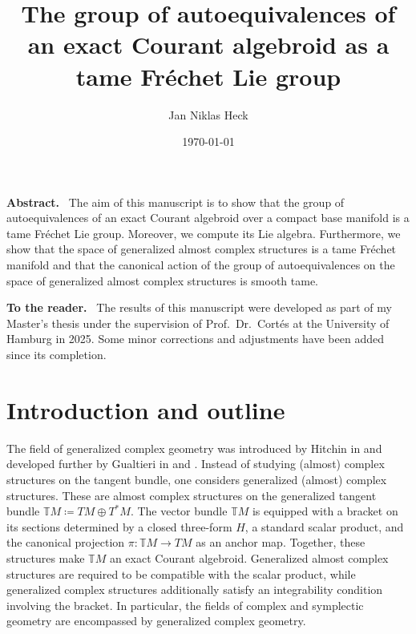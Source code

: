\documentclass[12pt,a4paper]{article}
\title{The group of autoequivalences of an exact Courant algebroid as a tame Fréchet Lie group}
\author{Jan Niklas Heck}
\date{\today}
\theoremstyle{plain}
\theoremstyle{definition}
\newenvironment{tothereader}
{\par\bigskip
\begin{center}
\bfseries To the reader
\end{center}
\begin{quote}}
{\end{quote}\par\bigskip}
\renewenvironment{tothereader}
  {\small\noindent\textbf{To the reader.}\ }
  {}
\newcommand{\GenTM}{\mathbb TM}
\renewenvironment{abstract}
  {\small\noindent\textbf{Abstract.}\ }
  {}
\begin{document}


\maketitle

\begin{abstract}
The aim of this manuscript is to show that the group of autoequivalences of an exact Courant algebroid over a compact base manifold is a tame Fréchet Lie group.
Moreover, we compute its Lie algebra.
Furthermore, we show that the space of generalized almost complex structures is a tame Fréchet manifold and that the canonical action of the group of autoequivalences on the space of generalized almost complex structures is smooth tame.
\end{abstract}
\newline

\begin{tothereader}
The results of this manuscript were developed as part of my Master's thesis \cite{MyMastThesis} under the supervision of Prof.~Dr.~Cortés at the University of Hamburg in 2025.
Some minor corrections and adjustments have been added since its completion. 
\end{tothereader}





\tableofcontents





\section{Introduction and outline}

The field of generalized complex geometry was introduced by Hitchin in \cite{Hitchin_2003} and developed further by Gualtieri in \cite{gualtieri} and \cite{gualtieriAnn}. Instead of studying (almost) complex structures on the tangent bundle, one considers generalized (almost) complex structures. These are almost complex structures on the generalized tangent bundle $\GenTM\coloneqq TM\oplus T^*M$. The vector bundle $\GenTM$ is equipped with a bracket on its sections determined by a closed three-form $H$, a standard scalar product, and the canonical projection $\pi:\GenTM\to TM$ as an anchor map. Together, these structures make $\GenTM$ an exact Courant algebroid. Generalized almost complex structures are required to be compatible with the scalar product, while generalized complex structures additionally satisfy an integrability condition involving the bracket.
In particular, the fields of complex and symplectic geometry are encompassed by generalized complex geometry.
\end{document}
